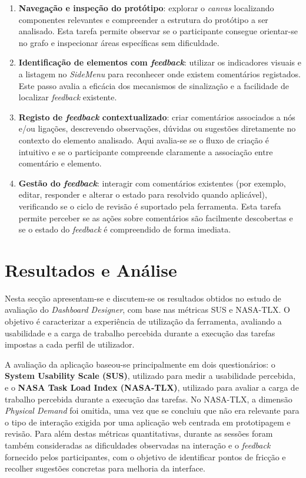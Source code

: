 \begin{enumerate}
    \item \textbf{Navegação e inspeção do protótipo}: explorar o \textit{canvas} localizando componentes relevantes e compreender a estrutura do protótipo a ser analisado. Esta tarefa permite observar se o participante consegue orientar-se no grafo e inspecionar áreas específicas sem dificuldade.
    \item \textbf{Identificação de elementos com \textit{feedback}}: utilizar os indicadores visuais e a listagem no \textit{SideMenu} para reconhecer onde existem comentários registados. Este passo avalia a eficácia dos mecanismos de sinalização e a facilidade de localizar \textit{feedback} existente.
    \item \textbf{Registo de \textit{feedback} contextualizado}: criar comentários associados a nós e/ou ligações, descrevendo observações, dúvidas ou sugestões diretamente no contexto do elemento analisado. Aqui avalia-se se o fluxo de criação é intuitivo e se o participante compreende claramente a associação entre comentário e elemento.
    \item \textbf{Gestão do \textit{feedback}}: interagir com comentários existentes (por exemplo, editar, responder e alterar o estado para resolvido quando aplicável), verificando se o ciclo de revisão é suportado pela ferramenta. Esta tarefa permite perceber se as ações sobre comentários são facilmente descobertas e se o estado do \textit{feedback} é compreendido de forma imediata.
\end{enumerate}

\section{Resultados e Análise}
\label{sec:cap5_results}

Nesta secção apresentam-se e discutem-se os resultados obtidos no estudo de avaliação do \textit{Dashboard Designer}, com base nas métricas SUS e NASA-TLX. O objetivo é caracterizar a experiência de utilização da ferramenta, avaliando a usabilidade e a carga de trabalho percebida durante a execução das tarefas impostas a cada perfil de utilizador. 

A avaliação da aplicação baseou-se principalmente em dois questionários: o \textbf{System Usability Scale (SUS)}, utilizado para medir a usabilidade percebida, e o \textbf{NASA Task Load Index (NASA-TLX)}, utilizado para avaliar a carga de trabalho percebida durante a execução das tarefas. No NASA-TLX, a dimensão \textit{Physical Demand} foi omitida, uma vez que se concluiu que não era relevante para o tipo de interação exigida por uma aplicação web centrada em prototipagem e revisão. Para além destas métricas quantitativas, durante as sessões foram também consideradas as dificuldades observadas na interação e o \textit{feedback} fornecido pelos participantes, com o objetivo de identificar pontos de fricção e recolher sugestões concretas para melhoria da interface.

